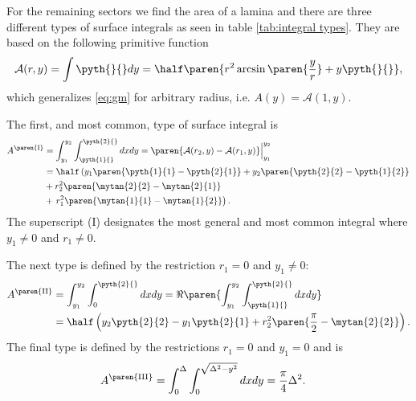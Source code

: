 \documentclass[final,leqno,onefignum,onetabnum]{siamltex1213}
\begin{document}
For the remaining sectors we find the area of a lamina and there are three different types of surface integrals as seen in table \eqref{tab:integral types}. They are based on the following primitive function
  \begin{equation}
    \mathcal{A}(r, y) = \int \pyth{}{} dy = \half \paren{r^{2} \arcsin \paren{\frac{y}{r}} + y \pyth{}{} },
  \end{equation}
which generalizes \eqref{eq:gm} for arbitrary radius, i.e. $A(y) = \mathcal{A}(1, y)$.


The first, and most common, type of surface integral is
  \begin{equation}
    \begin{split}
      A^{\paren{\mathrm{I}}} 
      &= \int_{y_{1}}^{y_{2}} \int_{\pyth{1}{}}^{\pyth{2}{}} dx dy 
       = \paren{ \mathcal{A}(r_{2}, y) - \mathcal{A}(r_{1}, y)} \Big|_{y_{1}}^{y_{2}}\\
      &= \half \left(
         y_{1} \paren{\pyth{1}{1} - \pyth{2}{1}}
       + y_{2} \paren{\pyth{2}{2} - \pyth{1}{2}} \right. \\ 
      &+        r_{2}^{2} \paren{ \mytan{2}{2} - \mytan{2}{1} } \\
      &+ \left. r_{1}^{2} \paren{ \mytan{1}{1} - \mytan{1}{2} } \right) .
    \end{split}
  \label{eq:area I}
  \end{equation}
The superscript (I) designates the most general and most common integral where $y_{1}\ne0$ and $r_{1}\ne0$. 

The next type is defined by the restriction $r_{1} = 0$ and $y_{1}\ne0$:
  \begin{equation}
    \begin{split}
      A^{\paren{\mathrm{II}}} 
      &= \int_{y_{1}}^{y_{2}} \int_{0}^{\pyth{2}{}} dx dy = \Re \paren{\int_{y_{1}}^{y_{2}} \int_{\pyth{1}{}}^{\pyth{2}{}} dx dy}\\
      &= \half \left(
         y_{2} \pyth{2}{2} - y_{1} \pyth{2}{1} + r_{2}^{2} \paren{ \frac{\pi}{2} - \mytan{2}{2} } \right) .
    \end{split}
  \label{eq:area II}
  \end{equation}
The final type is defined by the restrictions $r_{1} = 0$ and $y_{1}=0$ and is
  \begin{equation}
    \begin{split}
      A^{\paren{\mathrm{III}}} 
      &= \int_{0}^{\Delta} \int_{0}^{\sqrt{\Delta^{2} - y^{2}}} dx dy = \frac{\pi}{4} \Delta^{2} .
    \end{split}
  \label{eq:area III}
  \end{equation}
\end{document}
